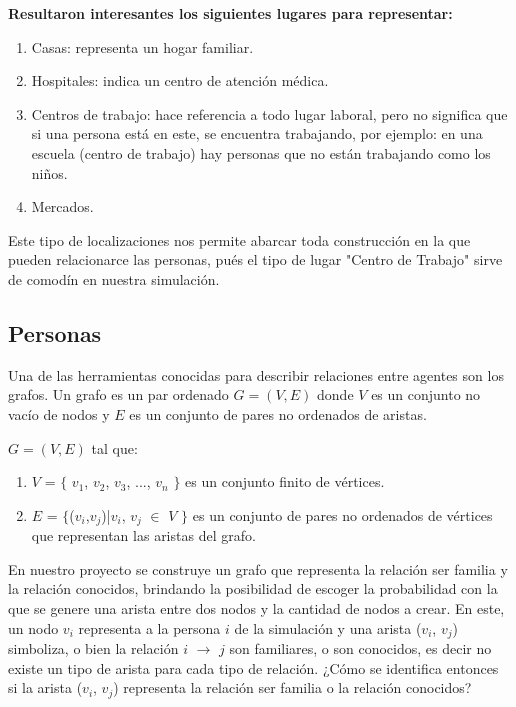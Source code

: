 \textbf{Resultaron interesantes los siguientes lugares para representar:}
\begin{enumerate}
    \item Casas: representa un hogar familiar.
    \item Hospitales: indica un centro de atención médica.
    \item Centros de trabajo: hace referencia a todo lugar laboral, pero no significa que si una persona está en este, se encuentra trabajando, por ejemplo: en una escuela (centro de trabajo) hay personas que no están trabajando como los niños.
    \item Mercados.
\end{enumerate}

Este tipo de localizaciones nos permite abarcar toda construcción en la que pueden relacionarce las personas, pués
el tipo de lugar "Centro de Trabajo" sirve de comodín en nuestra simulación.\\

\subsection{Personas}
Una de las herramientas conocidas para describir relaciones entre agentes son los grafos. Un grafo
es un par ordenado $G = (V,E)$ donde $V$ es un conjunto no vacío de nodos y $E$ es un conjunto de pares 
no ordenados de aristas.\\

\begin{center}
    $G=(V,E)$ tal que:\\
    \begin{enumerate}
        \item $V$ = $\lbrace$ $v_{1}$, $v_{2}$, $v_{3}$, ..., $v_{n}$ $\rbrace$ es un conjunto finito de vértices.
        \item $E$ = $\lbrace$($v_{i}$,$v_{j}$)|$v_{i}$, $v_{j}$ $\in$ $V$ $\rbrace$  es un conjunto de pares no ordenados de vértices que representan las aristas del grafo.
    \end{enumerate}
\end{center}

En nuestro proyecto se construye un grafo que representa la relación ser familia y la relación conocidos, brindando
la posibilidad de escoger la probabilidad con la que se genere una arista entre dos nodos y la cantidad de nodos a crear. 
En este, un nodo $v_{i}$ representa a la persona $i$ de la simulación y una arista ($v_{i}$, $v_{j}$) simboliza,
o bien la relación $i$ $\rightarrow$ $j$ son familiares, o son conocidos, es decir no existe un tipo de arista para cada
tipo de relación. ¿Cómo se identifica entonces si la arista ($v_{i}$, $v_{j}$) representa la relación 
ser familia o la relación conocidos?\\

